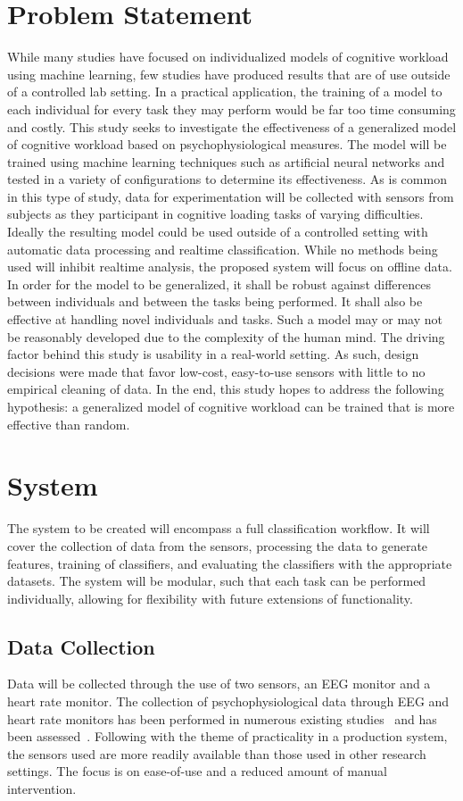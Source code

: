 \documentclass[11pt]{article}
\begin{document}
\section{Problem Statement}
While many studies have focused on individualized models of cognitive workload using machine learning, few studies have produced results that are of use outside of a controlled lab setting. In a practical application, the training of a model to each individual for every task they may perform would be far too time consuming and costly. This study seeks to investigate the effectiveness of a generalized model of cognitive workload based on psychophysiological measures. The model will be trained using machine learning techniques such as artificial neural networks and tested in a variety of configurations to determine its effectiveness. As is common in this type of study, data for experimentation will be collected with sensors from subjects as they participant in cognitive loading tasks of varying difficulties. Ideally the resulting model could be used outside of a controlled setting with automatic data processing and realtime classification. While no methods being used will inhibit realtime analysis, the proposed system will focus on offline data. In order for the model to be generalized, it shall be robust against differences between individuals and between the tasks being performed. It shall also be effective at handling novel individuals and tasks. Such a model may or may not be reasonably developed due to the complexity of the human mind. The driving factor behind this study is usability in a real-world setting. As such, design decisions were made that favor low-cost, easy-to-use sensors with little to no empirical cleaning of data.  In the end, this study hopes to address the following hypothesis: a generalized model of cognitive workload can be trained that is more effective than random. 

\section{System}
The system to be created will encompass a full classification workflow. It will cover the collection of data from the sensors, processing the data to generate features, training of classifiers, and evaluating the classifiers with the appropriate datasets. The system will be modular, such that each task can be performed individually, allowing for flexibility with future extensions of functionality.  

\subsection{Data Collection}
Data will be collected through the use of two sensors, an EEG monitor and a heart rate monitor. The collection of psychophysiological data through EEG and heart rate monitors has been performed in numerous existing studies~\cite{Wilson, Yang, Wang_Z} and has been assessed~\cite{Sweller}. Following with the theme of practicality in a production system, the sensors used are more readily available than those used in other research settings. The focus is on ease-of-use and a reduced amount of manual intervention.
\end{document}
